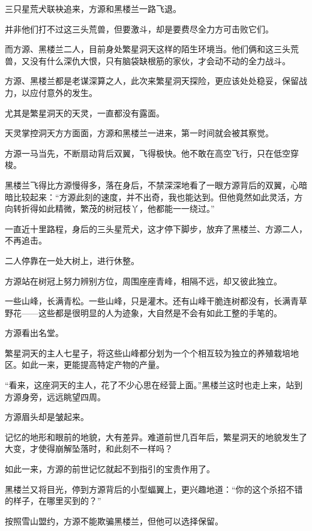 
\begin{this_body}

三只星荒犬联袂追来，方源和黑楼兰一路飞退。

并非他们打不过这三头荒兽，但要激斗，却是要费尽全力方可击败它们。

而方源、黑楼兰二人，目前身处繁星洞天这样的陌生环境当。他们俩和这三头荒兽，又没有什么深仇大恨，只有脑袋缺根筋的家伙，才会动不动的全力战斗。

方源、黑楼兰都是老谋深算之人，此次来繁星洞天探险，更应该处处稳妥，保留战力，以应付意外的发生。

尤其是繁星洞天的天灵，一直都没有露面。

天灵掌控洞天方方面面，方源和黑楼兰一进来，第一时间就会被其察觉。

方源一马当先，不断扇动背后双翼，飞得极快。他不敢在高空飞行，只在低空穿梭。

黑楼兰飞得比方源慢得多，落在身后，不禁深深地看了一眼方源背后的双翼，心暗暗比较起来：“方源此刻的速度，并不出奇，我也能达到。但他竟然如此灵活，方向转折得如此精微，繁茂的树冠枝丫，他都能一一绕过。”

一直近十里路程，身后的三头星荒犬，这才停下脚步，放弃了黑楼兰、方源二人，不再追击。

二人停靠在一处大树上，进行休整。

方源站在树冠上努力辨别方位，周围座座青峰，相隔不远，却又彼此独立。

一些山峰，长满青松。一些山峰，只是灌木。还有山峰干脆连树都没有，长满青草野花——这些都是很明显的人为迹象，大自然是不会有如此工整的手笔的。

方源看出名堂。

繁星洞天的主人七星子，将这些山峰都分划为一个个相互较为独立的养殖栽培地区。如此一来，更能提高特定产物的产量。

“看来，这座洞天的主人，花了不少心思在经营上面。”黑楼兰这时也走上来，站到方源身旁，远远眺望四周。

方源眉头却是皱起来。

记忆的地形和眼前的地貌，大有差异。难道前世几百年后，繁星洞天的地貌发生了大变，才使得崩解坠落时，和此刻不一样吗？

如此一来，方源的前世记忆就起不到指引的宝贵作用了。

黑楼兰又将目光，停到方源背后的小型蝠翼上，更兴趣地道：“你的这个杀招不错的样子，在哪里买到的？”

按照雪山盟约，方源不能欺骗黑楼兰，但他可以选择保留。


\end{this_body}
